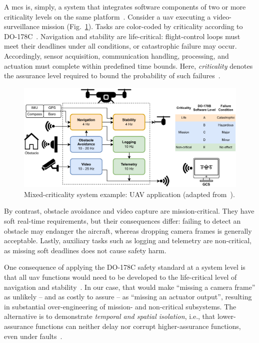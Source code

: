 A \gls{mcs} is, simply, a system that integrates software components of two or
more criticality levels on the same platform~\cite{davis_mixed_2018}. Consider a
\gls{uav} executing a video-surveillance mission
(Fig.~\ref{fig:mcs-example}). Tasks are color-coded by criticality according to
DO-178C~\cite{sc_167_software_1992,youn_software_2015}. Navigation and stability
are life-critical: flight-control loops must meet their deadlines under all
conditions, or catastrophic failure may occur. Accordingly, sensor acquisition,
communication handling, processing, and actuation must complete within
predefined time bounds. Here, \emph{criticality} denotes the assurance level
required to bound the probability of such
failures~\cite{sc_167_software_1992,youn_software_2015}.

\begin{figure}[!hbtp]
  \centering
  \includegraphics[width=1.0\textwidth]{./img/pdf/mcs-example}
  \caption[Mixed-criticality system example: UAV application]{Mixed-criticality system example: UAV application (adapted from~\cite{yip_relaxing_2014}).}%
  \label{fig:mcs-example}
\end{figure}

By contrast, obstacle avoidance and video capture are mission-critical. They
have soft real-time requirements, but their consequences differ: failing to
detect an obstacle may endanger the aircraft, whereas dropping camera frames is
generally acceptable. Lastly, auxiliary tasks such as logging and telemetry are
non-critical, as missing soft deadlines does not cause safety harm.

One consequence of applying the DO-178C safety standard at a system level is that all \gls{uav}
functions would need to be developed to the life-critical level of navigation
and stability~\cite{youn_software_2015,davis_mixed_2018}. In our case, that
would make ``missing a camera frame'' as unlikely -- and as costly to assure -- as
``missing an actuator output'', resulting in substantial over-engineering of
mission- and non-critical subsystems. The alternative is to demonstrate
\emph{temporal and spatial isolation}, i.e., that lower-assurance functions can
neither delay nor corrupt higher-assurance functions, even under
faults~\cite{cinque2022virtualizing,davis_mixed_2018}.


